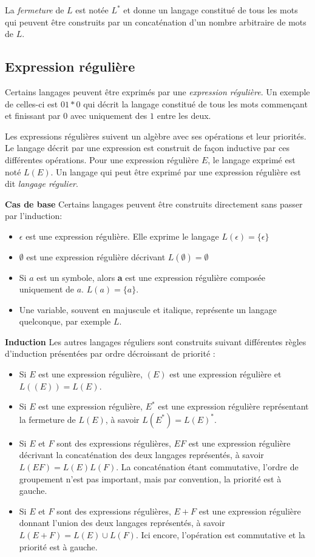 La \emph{fermeture} de $L$ est notée $L^*$ et donne un langage constitué de tous les mots qui peuvent être construits par un concaténation d'un nombre arbitraire de mots de $L$.

\subsection{Expression régulière}\label{ss:regex}

Certains langages peuvent être exprimés par une \emph{expression régulière}. Un exemple de celles-ci est $01*0$ qui décrit la langage constitué de tous les mots commençant et finissant par $0$ avec uniquement des $1$ entre les deux.

Les expressions régulières suivent un algèbre avec ses opérations et leur priorités. Le langage décrit par une expression est construit de façon inductive par ces différentes opérations. Pour une expression régulière $E$, le langage exprimé est noté $L(E)$. Un langage qui peut être exprimé par une expression régulière est dit \emph{langage régulier}.


\textbf{Cas de base}
Certains langages peuvent être construits directement sans passer par l'induction:

\begin{itemize}
	\item $\epsilon$ est une expression régulière. Elle exprime le langage $L(\epsilon)=\{\epsilon\}$
	\item $\emptyset$ est une expression régulière décrivant $L(\emptyset)=\emptyset$
	\item Si $a$ est un symbole, alors \textbf{a} est une expression régulière composée uniquement de $a$. $L(a) = \{a\}$.
	\item Une variable, souvent en majuscule et italique, représente un langage quelconque, par exemple $L$.
\end{itemize}


\textbf{Induction}
Les autres langages réguliers sont construits suivant différentes règles d'induction présentées par ordre décroissant de priorité :

\begin{itemize}
	\item Si $E$ est une expression régulière, $(E)$ est une expression régulière et $L((E)) = L(E)$.
	\item Si $E$ est une expression régulière, $E^*$ est une expression régulière représentant la fermeture de $L(E)$, à savoir $L(E^*) = L(E)^*$.
	\item Si $E$ et $F$ sont des expressions régulières, $EF$ est une expression régulière décrivant la concaténation des deux langages représentés, à savoir $L(EF)=L(E)L(F)$. La concaténation étant commutative, l'ordre de groupement n'est pas important, mais par convention, la priorité est à gauche.
	\item Si $E$ et $F$ sont des expressions régulières, $E+F$ est une expression régulière donnant l'union des deux langages représentés, à savoir $L(E+F)=L(E)\cup L(F)$. Ici encore, l'opération est commutative et la priorité est à gauche.
\end{itemize}
	
